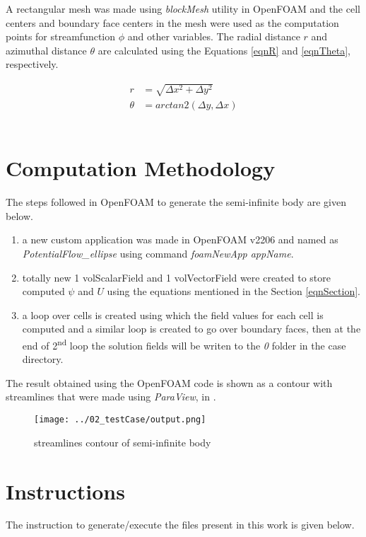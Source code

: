 \documentclass[12pt]{article}
\begin{document}
A rectangular mesh was made using \emph{blockMesh} utility in OpenFOAM and the cell
centers and boundary face centers in the mesh were used as the computation points
for streamfunction \(\phi\) and other variables. The radial distance \(r\)
and azimuthal distance \(\theta\) are calculated using the Equations
\ref{eqnR} and \ref{eqnTheta}, respectively.

\begin{align}
	r & = \sqrt{\Delta x^2 + \Delta y^2} \label{eqnR} \\
	\theta & = arctan2( \Delta y, \Delta x) \label{eqnTheta}
\end{align}\\

\section{Computation Methodology}
The steps followed in OpenFOAM to generate the semi-infinite body are given below.


\begin{enumerate}
	\item a new custom application was made in OpenFOAM v2206 and named as \emph{PotentialFlow\_ellipse} using command \emph{foamNewApp appName}.
	\item totally new 1 volScalarField and 1 volVectorField were created to store computed \(\displaystyle{\psi}\) and \(\displaystyle{U}\) using the equations mentioned in the Section \ref{eqnSection}.
	\item a loop over cells is created using which the field values for each cell is computed and a similar loop is created to go over boundary faces, then at the end of 2\textsuperscript{nd} loop the solution fields will be writen to the \emph{0} folder in the case directory.
\end{enumerate}

The result obtained using the OpenFOAM code is shown as a contour with streamlines that were made using \emph{ParaView}, in .

\begin{figure}
	\texttt{[image: ../02\_testCase/output.png]}
	\caption{streamlines contour of semi-infinite body}
	\label{fig:contour}
\end{figure}

\pagebreak

\section{Instructions}
The instruction to generate/execute the files present in this work is given below.
\end{document}
